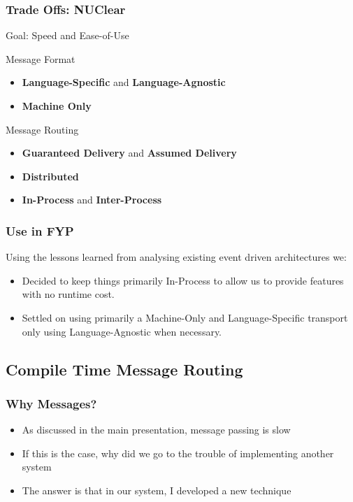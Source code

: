 \documentclass{beamer}
\begin{document}
	\begin{frame}
		\frametitle{Trade Offs: NUClear}
		
		Goal: Speed and Ease-of-Use
		
		Message Format	
		\begin{itemize}
			\item \textbf{Language-Specific} and \textbf{Language-Agnostic}
			\item \textbf{Machine Only}
		\end{itemize}
		
		Message Routing
		\begin{itemize}
			\item \textbf{Guaranteed Delivery} and \textbf{Assumed Delivery}
			\item \textbf{Distributed}
			\item \textbf{In-Process} and \textbf{Inter-Process}
		\end{itemize}
	\end{frame}
	
	\begin{frame}
		\frametitle{Use in FYP}
		
		Using the lessons learned from analysing existing event driven architectures we:
		\begin{itemize}
			\item Decided to keep things primarily In-Process to allow us to provide features with no runtime cost.
			\item Settled on using primarily a Machine-Only and Language-Specific transport only using Language-Agnostic when necessary.
		\end{itemize}
	\end{frame}
	
	\subsection{Compile Time Message Routing}
	\begin{frame}
		\subsectionpage
	\end{frame}
	
	\begin{frame}
		\frametitle{Why Messages?}
		\begin{itemize}
			\item As discussed in the main presentation, message passing is slow
			\item If this is the case, why did we go to the trouble of implementing another system
			\item The answer is that in our system, I developed a new technique
		\end{itemize}
	\end{frame}
	
\end{document}
